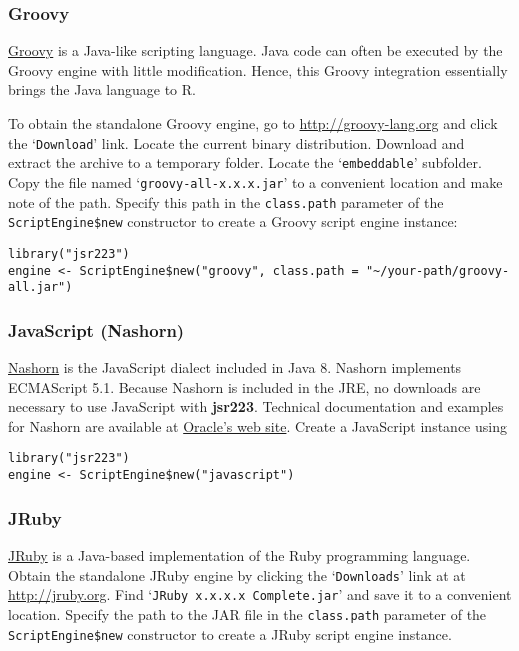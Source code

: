 \documentclass[
article,
11pt, %
a4paper, %
oneside, %
headinclude,footinclude, %
]{scrartcl}
\theoremstyle{definition} %
\theoremstyle{plain} %
\theoremstyle{remark} %
\newcommand{\pkg}[1]{\textbf{#1}}
\newcommand{\code}[1]{\texttt{#1}}
\newcommand{\samp}[1]{{`\normalfont\texttt{#1}'}}
\begin{document}
\subsubsection{Groovy}

\href{http://groovy-lang.org}{Groovy} is a Java-like scripting language. Java code can often be executed by the Groovy engine with little modification. Hence, this Groovy integration essentially brings the Java language to R.

To obtain the standalone Groovy engine, go to \url{http://groovy-lang.org} and click the \samp{Download} link. Locate the current binary distribution. Download and extract the archive to a temporary folder. Locate the \samp{embeddable} subfolder. Copy the file named \samp{groovy-all-x.x.x.jar} to a convenient location and make note of the path. Specify this path in the \code{class.path} parameter of the \code{ScriptEngine\$new} constructor to create a Groovy script engine instance:

\begin{verbatim}
library("jsr223")
engine <- ScriptEngine$new("groovy", class.path = "~/your-path/groovy-all.jar")
\end{verbatim}

\subsubsection{JavaScript (Nashorn)}

\href{https://docs.oracle.com/javase/8/docs/technotes/guides/scripting/nashorn/}{Nashorn} is the JavaScript dialect included in Java 8. Nashorn implements ECMAScript 5.1. Because Nashorn is included in the JRE, no downloads are necessary to use JavaScript with \pkg{jsr223}. Technical documentation and examples for Nashorn are available at \href{https://docs.oracle.com/javase/8/docs/technotes/guides/scripting/nashorn/}{Oracle's web site}. Create a JavaScript instance using

\begin{verbatim}
library("jsr223")
engine <- ScriptEngine$new("javascript")
\end{verbatim}

\subsubsection{JRuby}

\href{http://jruby.org}{JRuby} is a Java-based implementation of the Ruby programming language. Obtain the standalone JRuby engine by clicking the \samp{Downloads} link at at \url{http://jruby.org}. Find \samp{JRuby x.x.x.x Complete.jar} and save it to a convenient location. Specify the path to the JAR file in the \code{class.path} parameter of the \code{ScriptEngine\$new} constructor to create a JRuby script engine instance.
\end{document}

